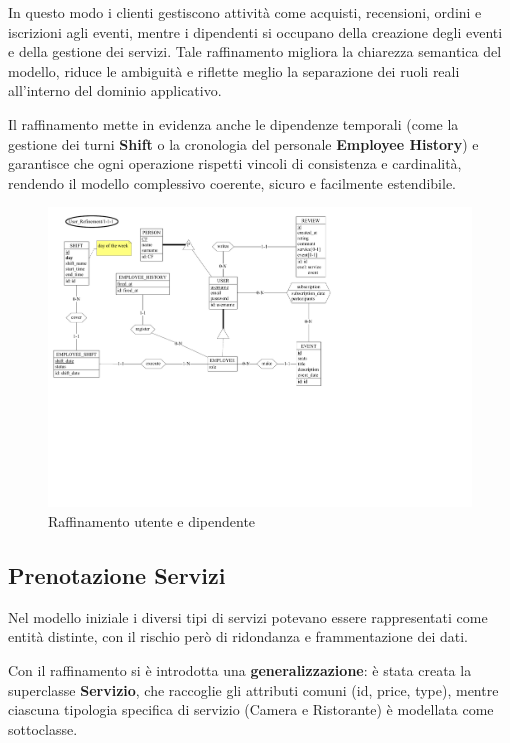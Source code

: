 \documentclass[a4paper,12pt]{report}
\begin{document}
\vspace{\baselineskip}
In questo modo i clienti gestiscono attività come acquisti,
recensioni, ordini e iscrizioni agli eventi, mentre i dipendenti si
occupano della creazione degli eventi e della gestione dei servizi.
Tale raffinamento migliora la chiarezza semantica del modello, riduce
le ambiguità e riflette meglio la separazione dei ruoli reali
all'interno del dominio applicativo.

\vspace{\baselineskip}
Il raffinamento mette in evidenza anche le dipendenze temporali (come
  la gestione dei turni \textbf{Shift} o la cronologia del personale
\textbf{Employee History}) e garantisce che ogni operazione rispetti
vincoli di consistenza e cardinalità, rendendo il modello complessivo
coerente, sicuro e facilmente estendibile.

\begin{figure}[H]
  \centering
  \includegraphics[width=\textwidth, trim=0 200pt 275pt 0,
  clip]{./schemas/refinements/user.pdf}
  \caption{Raffinamento utente e dipendente}
  \label{fig:raffinamento-utente}
\end{figure}

\newpage
\subsection{Prenotazione Servizi}
Nel modello iniziale i diversi tipi di servizi potevano essere
rappresentati come entità distinte, con il rischio però di ridondanza
e frammentazione dei dati.

\vspace{\baselineskip}
Con il raffinamento si è introdotta una \textbf{generalizzazione}: è
stata creata la superclasse \textbf{Servizio}, che raccoglie gli
attributi comuni (id, price, type), mentre ciascuna tipologia
specifica di servizio (Camera e Ristorante) è modellata come sottoclasse.
\end{document}

